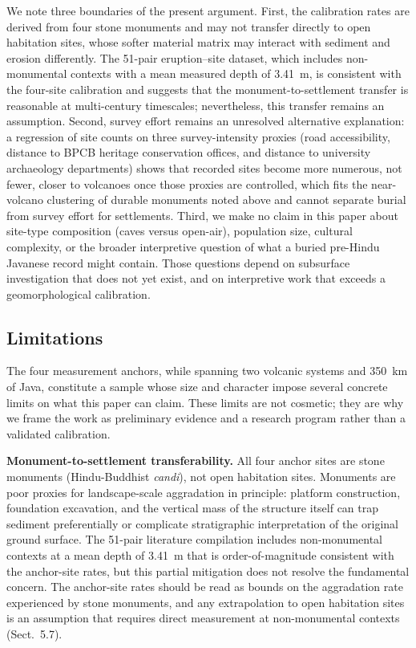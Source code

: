 \documentclass[12pt,a4paper]{article}
\begin{document}
We note three boundaries of the present argument. First, the calibration rates are derived from four stone monuments and may not transfer directly to open habitation sites, whose softer material matrix may interact with sediment and erosion differently. The 51-pair eruption--site dataset, which includes non-monumental contexts with a mean measured depth of 3.41~m, is consistent with the four-site calibration and suggests that the monument-to-settlement transfer is reasonable at multi-century timescales; nevertheless, this transfer remains an assumption. Second, survey effort remains an unresolved alternative explanation: a regression of site counts on three survey-intensity proxies (road accessibility, distance to BPCB heritage conservation offices, and distance to university archaeology departments) shows that recorded sites become more numerous, not fewer, closer to volcanoes once those proxies are controlled, which fits the near-volcano clustering of durable monuments noted above and cannot separate burial from survey effort for settlements. Third, we make no claim in this paper about site-type composition (caves versus open-air), population size, cultural complexity, or the broader interpretive question of what a buried pre-Hindu Javanese record might contain. Those questions depend on subsurface investigation that does not yet exist, and on interpretive work that exceeds a geomorphological calibration.

\subsection{Limitations}

The four measurement anchors, while spanning two volcanic systems and 350~km of Java, constitute a sample whose size and character impose several concrete limits on what this paper can claim. These limits are not cosmetic; they are why we frame the work as preliminary evidence and a research program rather than a validated calibration.

\textbf{Monument-to-settlement transferability.} All four anchor sites are stone monuments (Hindu-Buddhist \textit{candi}), not open habitation sites. Monuments are poor proxies for landscape-scale aggradation in principle: platform construction, foundation excavation, and the vertical mass of the structure itself can trap sediment preferentially or complicate stratigraphic interpretation of the original ground surface. The 51-pair literature compilation includes non-monumental contexts at a mean depth of 3.41~m that is order-of-magnitude consistent with the anchor-site rates, but this partial mitigation does not resolve the fundamental concern. The anchor-site rates should be read as bounds on the aggradation rate experienced by stone monuments, and any extrapolation to open habitation sites is an assumption that requires direct measurement at non-monumental contexts (Sect.~5.7).
\end{document}
